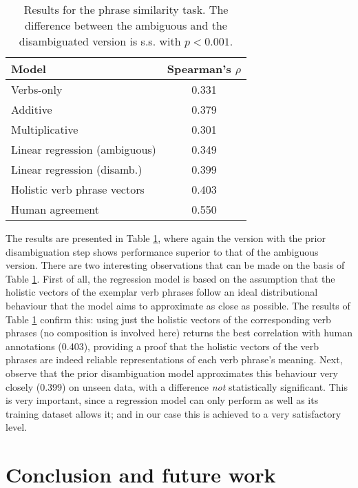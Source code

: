 \documentclass[11pt]{article}
\begin{document}
\begin{table}[t]
  \centering
  \small
  \begin{tabular}{lc}
    \hline
    \textbf{Model} & \textbf{Spearman's $\rho$} \\
    \hline\hline
    Verbs-only &   0.331    \\
    Additive & 0.379 \\
    Multiplicative & 0.301 \\
    Linear regression (ambiguous) & 0.349 \\
    Linear regression (disamb.) & 0.399 \\
    \hline
    Holistic verb phrase vectors & 0.403 \\
    \hline
    Human agreement & 0.550 \\
    \hline
  \end{tabular}
  \caption{Results for the phrase similarity task. The difference between the ambiguous and the disambiguated version is s.s. with $p < 0.001$.}
  \label{tbl:exp2results}
  \normalsize
\end{table}    

The results are presented in Table \ref{tbl:exp2results}, where again the version with the prior disambiguation step shows performance superior to that of the ambiguous version. There are two interesting observations that can be made on the basis of Table \ref{tbl:exp2results}. First of all, the regression model is based on the assumption that the holistic vectors of the exemplar verb phrases follow an ideal distributional behaviour that the model aims to approximate as close as possible. The results of Table \ref{tbl:exp2results} confirm this: using just the holistic vectors of the corresponding verb phrases (no composition is involved here) returns the best correlation with human annotations (0.403), providing a proof that the holistic vectors of the verb phrases are indeed reliable representations of each verb phrase's meaning. Next, observe that the prior disambiguation model approximates this behaviour very closely (0.399) on unseen data, with a difference \textit{not} statistically significant. This is very important, since a regression model can only perform as well as its training dataset allows it; and in our case this is achieved to a very satisfactory level.

\section{Conclusion and future work}
\label{sec:conclusion}
\end{document}
